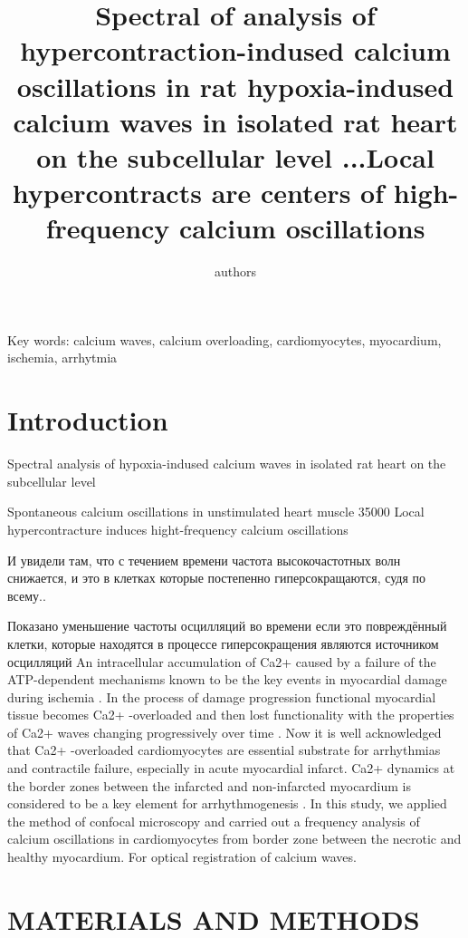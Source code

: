 \documentclass[a4paper,12pt]{article}
\title{Spectral of analysis of hypercontraction-indused calcium oscillations in rat hypoxia-indused calcium waves in isolated rat heart on the subcellular level
...Local hypercontracts are centers of high-frequency calcium oscillations}
\author{authors}
\begin{document}
\maketitle

Key words: calcium waves, calcium overloading, cardiomyocytes, myocardium, ischemia, arrhytmia

\section{Introduction}

Spectral analysis of hypoxia-indused calcium waves in isolated rat heart on the subcellular level

Spontaneous calcium oscillations in unstimulated heart muscle
35000
Local hypercontracture induces hight-frequency calcium oscillations

И увидели там, что с течением времени частота высокочастотных волн снижается, и это в клетках которые постепенно гиперсокращаются, судя по всему..

Показано уменьшение частоты осцилляций во времени
если это повреждённый клетки, которые находятся в процессе гиперсокращения
являются источником осцилляций
An intracellular accumulation of Ca2+ caused by a failure of the ATP-dependent mechanisms known to be the key events in myocardial damage during ischemia \cite{shen1972myocardial,shen1972kinetics,nayler1981role}.
In the process of damage progression functional myocardial tissue becomes Ca2+ -overloaded and then lost functionality with the properties of Ca2+ waves changing progressively over time \cite{minamikawa1997situ,hama1998real}.
Now it is well acknowledged that Ca2+ -overloaded cardiomyocytes are essential substrate for arrhythmias and contractile failure, especially in acute myocardial infarct.
Ca2+ dynamics at the border zones between the infarcted and non-infarcted myocardium is considered to be a key element for arrhythmogenesis \cite{takamatsu2008arrhythmogenic}.
In this study, we applied the method of confocal microscopy and carried out a frequency analysis of calcium oscillations in cardiomyocytes from border zone between the necrotic and healthy myocardium.
For optical registration of calcium waves.

\cite{matsuura2018intravital}

\section{MATERIALS AND METHODS}
\end{document}
